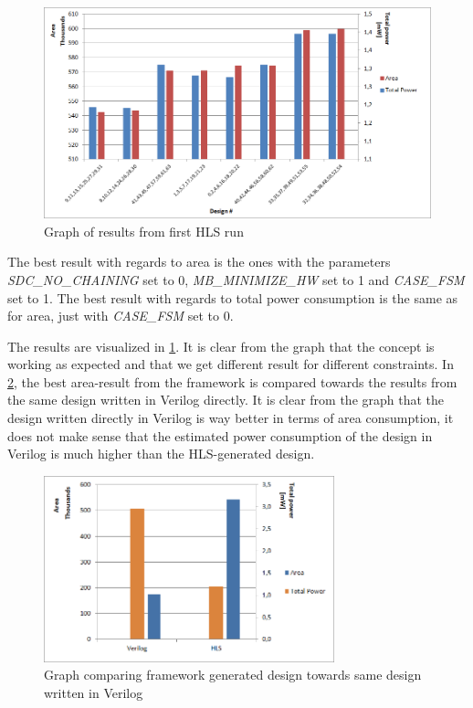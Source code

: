 \begin{figure}[hbpt]
\centering
\includegraphics[width=\textwidth]{../figs/resultGraph.png}
\caption{\label{fig:resultgraphhlsrun1}Graph of results from first HLS run}
\end{figure}
The best result with regards to area is the ones with the parameters \textit{SDC\_NO\_CHAINING} set to 0, \textit{MB\_MINIMIZE\_HW} set to 1 and \textit{CASE\_FSM} set to 1. The best result with regards to total power consumption is the same as for area, just with \textit{CASE\_FSM} set to 0.

The results are visualized in \cref{fig:resultgraphhlsrun1}. It is clear from the graph that the concept is working as expected and that we get different result for different constraints. In \cref{fig:resultcomparisonhlsrun1}, the best area-result from the framework is compared towards the results from the same design written in Verilog directly. It is clear from the graph that the design written directly in Verilog is way better in terms of area consumption, it does not make sense that the estimated power consumption of the design in Verilog is much higher than the HLS-generated design.

\begin{figure}[hbpt]
\centering
\includegraphics[width=0.75\textwidth]{../figs/resultComparison1.png}
\caption{\label{fig:resultcomparisonhlsrun1}Graph comparing framework generated design towards same design written in Verilog}
\end{figure}

